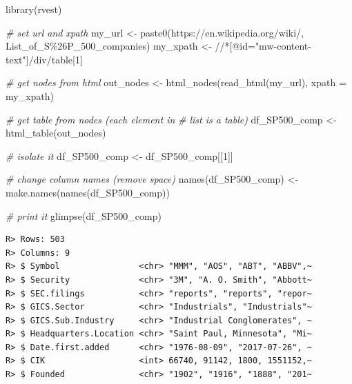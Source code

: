 \documentclass[
  12pt,
]{book}
\newenvironment{Shaded}{\begin{snugshade}}{\end{snugshade}}
\newcommand{\AttributeTok}[1]{\textcolor[rgb]{0.61,0.61,0.61}{#1}}
\newcommand{\CommentTok}[1]{\textcolor[rgb]{0.37,0.37,0.37}{\textit{#1}}}
\newcommand{\DecValTok}[1]{\textcolor[rgb]{0.06,0.06,0.06}{#1}}
\newcommand{\FunctionTok}[1]{\textcolor[rgb]{0,0,0}{#1}}
\newcommand{\NormalTok}[1]{#1}
\newcommand{\OtherTok}[1]{\textcolor[rgb]{0.37,0.37,0.37}{#1}}
\newcommand{\StringTok}[1]{\textcolor[rgb]{0.5,0.5,0.5}{#1}}
\begin{document}
\begin{Shaded}
\begin{Highlighting}[]
\FunctionTok{library}\NormalTok{(rvest)}

\CommentTok{\# set url and xpath}
\NormalTok{my\_url }\OtherTok{\textless{}{-}} \FunctionTok{paste0}\NormalTok{(}\StringTok{\textquotesingle{}https://en.wikipedia.org/wiki/\textquotesingle{}}\NormalTok{,}
                 \StringTok{\textquotesingle{}List\_of\_S\%26P\_500\_companies\textquotesingle{}}\NormalTok{)}
\NormalTok{my\_xpath }\OtherTok{\textless{}{-}} \StringTok{\textquotesingle{}//*[@id="mw{-}content{-}text"]/div/table[1]\textquotesingle{}}

\CommentTok{\# get nodes from html}
\NormalTok{out\_nodes }\OtherTok{\textless{}{-}} \FunctionTok{html\_nodes}\NormalTok{(}\FunctionTok{read\_html}\NormalTok{(my\_url),}
                        \AttributeTok{xpath =}\NormalTok{ my\_xpath)}

\CommentTok{\# get table from nodes (each element in }
\CommentTok{\# list is a table)}
\NormalTok{df\_SP500\_comp }\OtherTok{\textless{}{-}} \FunctionTok{html\_table}\NormalTok{(out\_nodes)}

\CommentTok{\# isolate it }
\NormalTok{df\_SP500\_comp }\OtherTok{\textless{}{-}}\NormalTok{ df\_SP500\_comp[[}\DecValTok{1}\NormalTok{]]}

\CommentTok{\# change column names (remove space)}
\FunctionTok{names}\NormalTok{(df\_SP500\_comp) }\OtherTok{\textless{}{-}} \FunctionTok{make.names}\NormalTok{(}\FunctionTok{names}\NormalTok{(df\_SP500\_comp))}

\CommentTok{\# print it}
\FunctionTok{glimpse}\NormalTok{(df\_SP500\_comp)}
\end{Highlighting}
\end{Shaded}

\begin{verbatim}
R> Rows: 503
R> Columns: 9
R> $ Symbol                <chr> "MMM", "AOS", "ABT", "ABBV",~
R> $ Security              <chr> "3M", "A. O. Smith", "Abbott~
R> $ SEC.filings           <chr> "reports", "reports", "repor~
R> $ GICS.Sector           <chr> "Industrials", "Industrials"~
R> $ GICS.Sub.Industry     <chr> "Industrial Conglomerates", ~
R> $ Headquarters.Location <chr> "Saint Paul, Minnesota", "Mi~
R> $ Date.first.added      <chr> "1976-08-09", "2017-07-26", ~
R> $ CIK                   <int> 66740, 91142, 1800, 1551152,~
R> $ Founded               <chr> "1902", "1916", "1888", "201~
\end{verbatim}
\end{document}
